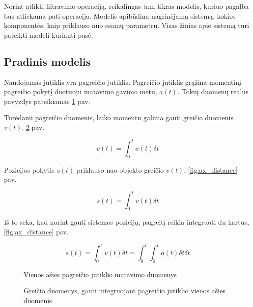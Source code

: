 Norint atlikti filtravimo operaciją, reikalingas tam tikras modelis, kuriuo pagalba bus atliekama pati operacija.
Modelis apibūdina nagrinėjamą sistemą, kokios komponentės, kaip priklauso nuo esamų parametrų.
Visas žinias apie sistemą turi pateikti modelį kurianti pusė.

\subsection{Pradinis modelis}

Naudojamas jutiklis yra pagreičio jutiklis.
Pagreičio jutiklis grąžina momentinį pagreičio pokytį duotuoju matavimo gavimo metu, $a(t)$.
Tokių duomenų realus pavyzdys pateikiamas \ref{fig:ax_accel} pav.

Turėdami pagreičio duomenis, laiko momentu galima gauti greičio duomenis $v(t)$, \ref{fig:ax_velocity} pav.

\begin{equation}
    v(t) = \int_0^t a(t) \delta t
\end{equation}

Pozicijos pokytis $s(t)$ priklauso nuo objekto greičio $v(t)$, \ref{fig:ax_distance} pav.

\begin{equation}
    s(t) = \int_0^tv(t) \delta t
\end{equation}

Iš to seka, kad norint gauti sistemos poziciją, pagreitį reikia integruoti du kartus, \ref{fig:ax_distance} pav.

\begin{equation}
    s(t) = \int_0^tv(t) \delta t = \int_0^t \int_0^t a(t) \delta t \delta t
\end{equation}

\begin{figure}[b]
    \centering
    \caption{Vienos ašies pagreičio jutiklio matavimo duomenys}
    \label{fig:ax_accel}
\end{figure}

\begin{figure}
    \centering
    \caption{Greičio duomenys, gauti integruojant pagreičio jutiklio vienos ašies duomenis}
    \label{fig:ax_velocity}
\end{figure}

